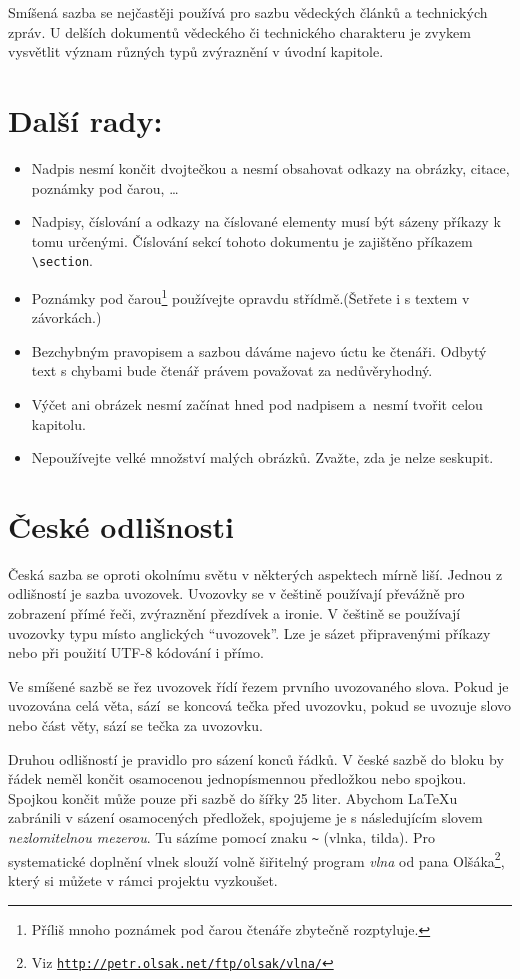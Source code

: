 \documentclass[twocolumn,a4paper,10pt,final]{article}
\begin{document}
	Smíšená sazba se nejčastěji používá pro sazbu vědeckých článků a technických zpráv.
	U delších dokumentů vědeckého či technického charakteru je zvykem vysvětlit význam různých typů zvýraznění v úvodní kapitole.
	\section{Další rady:}\label{sec:dalsi-rady}
	\begin{itemize}
		\item Nadpis nesmí končit dvojtečkou a nesmí obsahovat odkazy na obrázky, citace, poznámky pod čarou, \ldots
		\item Nadpisy, číslování a odkazy na číslované elementy musí být sázeny příkazy k tomu určenými.
		Číslování sekcí tohoto dokumentu je zajištěno příkazem \verb!\section!.
		\item Poznámky pod čarou\footnote{Příliš mnoho poznámek pod čarou čtenáře zbytečně rozptyluje.} používejte opravdu střídmě.\hfill (Šetřete i s textem v závorkách.)
		\item Bezchybným pravopisem a sazbou dáváme najevo úctu ke čtenáři. Odbytý text s chybami bude čtenář právem považovat za nedůvěryhodný.
		\item Výčet ani obrázek nesmí začínat hned pod nadpisem a~nesmí tvořit celou kapitolu.
		\item Nepoužívejte velké množství malých obrázků.
		Zvažte, zda je nelze seskupit.
	\end{itemize}
	\section{České odlišnosti}\label{sec:ceske-odlisnosti}
	Česká sazba se oproti okolnímu světu v některých aspektech mírně liší.
	Jednou z odlišností je sazba uvozovek.
	Uvozovky se v češtině používají převážně pro zobrazení přímé řeči, zvýraznění přezdívek a ironie.
	V češtině se používají uvozovky typu  místo anglických ``uvozovek''. Lze je sázet připravenými příkazy nebo při použití UTF-8 kódování i přímo.
	
	Ve smíšené sazbě se řez uvozovek řídí řezem prvního uvozovaného slova. Pokud je uvozována celá věta, sází~se koncová tečka před uvozovku, pokud se uvozuje slovo nebo část věty, sází se tečka za uvozovku.
	
	Druhou odlišností je pravidlo pro sázení konců řádků.
	V české sazbě do bloku by řádek neměl končit osamocenou jednopísmennou předložkou nebo spojkou.
	Spojkou  končit může pouze při sazbě do šířky 25 liter.
	Abychom \LaTeX u zabránili v sázení osamocených předložek, spojujeme je s následujícím slovem \emph{nezlomitelnou mezerou}.
	Tu sázíme pomocí znaku \verb!~! (vlnka, tilda).
	Pro systematické doplnění vlnek slouží volně šiřitelný program \emph{vlna} od pana Olšáka\footnote{Viz \texttt{\url{http://petr.olsak.net/ftp/olsak/vlna/}}}, který si můžete v rámci projektu vyzkoušet.
\end{document}
